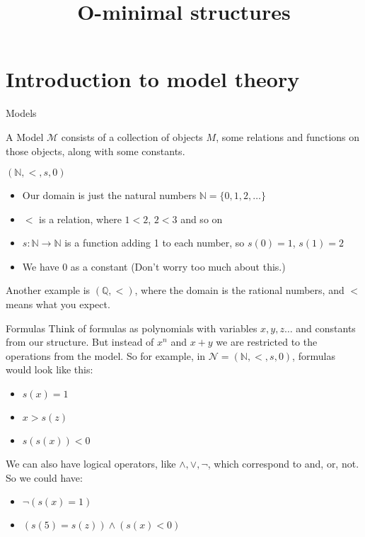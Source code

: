 \documentclass{beamer}
\title{O-minimal structures}
\begin{document}
\begin{frame}
    \titlepage
\end{frame}

\section{Introduction to model theory}

\begin{frame}{Models}
    \begin{definition}
        A Model  $\mathcal{M}$ consists of a collection of objects $M$, some relations and functions on those objects, along with some constants.
    \end{definition}
    
\begin{example}
    $(\mathbb{N}, <, s, 0)$
     \begin{itemize}
         \item Our domain is just the natural numbers $\mathbb{N} = \{0, 1, 2, \ldots \}$
         \item $<$ is a relation, where $1 < 2$, $2 < 3$ and so on
         \item $s:\mathbb{N} \to \mathbb{N}$ is a function adding 1 to each number, so $s(0) = 1$, $s(1) = 2$
         \item We have $0$ as a constant (Don't worry too much about this.)
     \end{itemize}
     Another example is $(\mathbb{Q}, <)$, where the domain is the rational numbers, and $<$ means what you expect.
\end{example}
\end{frame}

\begin{frame}{Formulas}
    Think of formulas as polynomials with variables $x,y,z \ldots$ and constants from our structure. But instead of $x^n$ and $x + y$ we are restricted to the operations from the model. So for example, in $\mathcal{N} = (\mathbb{N}, <, s, 0)$, formulas would look like this:
    \begin{itemize}
        \item $s(x) = 1$
        \item $x > s(z)$
        \item $s(s(x)) < 0$
    \end{itemize}
    We can also have logical operators, like $\land, \lor, \neg$, which correspond to and, or, not. So we could have:
    \begin{itemize}
        \item $\neg(s(x) = 1)$
        \item $(s(5) = s(z)) \land (s(x) < 0)$
    \end{itemize}
\end{frame}
\end{document}
